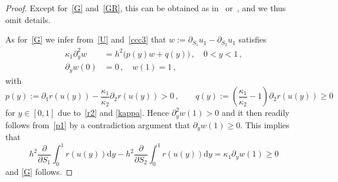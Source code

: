 \documentclass[reqno,11pt]{amsart}
\numberwithin{equation}{section}
\newcommand{\rd}{\mathrm{d}}
\begin{document}
\begin{proof}
Except for~\eqref{G} and~\eqref{GR},  this can be obtained as in~\cite[Proposition~2.1]{GW_QAM} or~\cite[Proposition~2.1]{NW26}, and we thus omit details. 

As for~\eqref{G} we infer from~\eqref{U} and~\eqref{ccc3} that
$w:=\partial_{S_1}u_1-\partial_{S_2}u_1$ satisfies
\begin{subequations}\label{p1}
\begin{align}
\kappa_1 \partial_{y}^2w&= h^2\big(p(y)w+q(y)\big)\,, \quad 0<y<1\,,\\
\partial_{y}w(0)&=0\,,\quad w(1)=1\,,  
\end{align}
\end{subequations}
with
$$
p(y):=\partial_1 r(u(y))-\frac{\kappa_1}{\kappa_2}\partial_2 r(u(y))> 0\,,\qquad q(y):=\left(\frac{\kappa_1}{\kappa_2}-1\right)\partial_2 r(u(y))\ge 0
$$
for $y\in [0,1]$ due to~\eqref{r2} and \eqref{kappa}. Hence $\partial_{y}^2w(1)>0$ and it then readily follows from~\eqref{p1} by a contradiction argument that
 $\partial_y w(1)\ge 0$. 
This implies that
$$
h^2\frac{\partial}{\partial {S_1}}\int_0^1 r(u(y)) \rd y- h^2\frac{\partial}{\partial {S_2}}\int_0^1 r(u(y)) \rd y =\kappa_1\partial_y w(1)\ge 0
$$
and \eqref{G} follows.


\end{proof}
\end{document}
